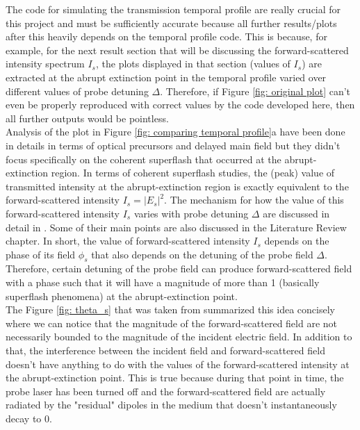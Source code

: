 The code for simulating the transmission temporal profile are really crucial for this project and must be sufficiently accurate because all further results/plots after this heavily depends on the temporal profile code. This is because, for example, for the next result section that will be discussing the forward-scattered intensity spectrum $I_{s}$, the plots displayed in that section (values of $I_{s}$) are extracted at the abrupt extinction point in the temporal profile varied over different values of probe detuning $\Delta$. Therefore, if Figure \ref{fig: original plot} can't even be properly reproduced with correct values by the code developed here, then all further outputs would be pointless.\\

Analysis of the plot in Figure \ref{fig: comparing temporal profile}a have been done in details in terms of optical precursors and delayed main field \cite{jeong2010slow} but they didn't focus specifically on the coherent superflash that occurred at the abrupt-extinction region. In terms of coherent superflash studies, the (peak) value of transmitted intensity at the abrupt-extinction region is exactly equivalent to the forward-scattered intensity $I_{s} = |E_{s}|^{2}$. The mechanism for how the value of this forward-scattered intensity $I_{s}$ varies with probe detuning $\Delta$ are discussed in detail in \cite{Chalony2011, Kwong2014, Kwong2017}. Some of their main points are also discussed in the Literature Review chapter. In short, the value of forward-scattered intensity $I_{s}$ depends on the phase of its field $\phi_{s}$ that also depends on the detuning of the probe field $\Delta$. Therefore, certain detuning of the probe field can produce forward-scattered field with a phase such that it will have a magnitude of more than 1 (basically superflash phenomena) at the abrupt-extinction point.\\

The Figure \ref{fig: theta_s} that was taken from \cite{Kwong2014} summarized this idea concisely where we can notice that the magnitude of the forward-scattered field are not necessarily bounded to the magnitude of the incident electric field. In addition to that, the interference between the incident field and forward-scattered field doesn't have anything to do with the values of the forward-scattered intensity at the abrupt-extinction point. This is true because during that point in time, the probe laser has been turned off and the forward-scattered field are actually radiated by the "residual" dipoles in the medium that doesn't instantaneously decay to $0$.\\

